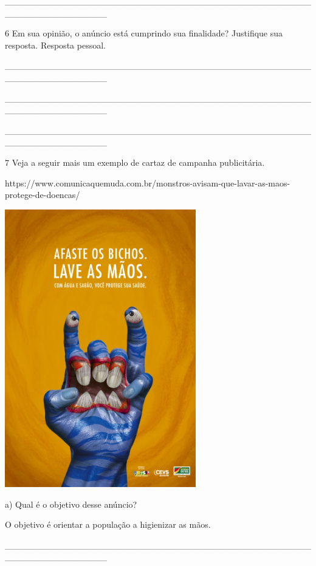 \begin{boxlist}
{\_\_\_\_\_\_\_\_\_\_\_\_\_\_\_\_\_\_\_\_\_\_\_\_\_\_\_\_\_\_\_\_\_\_\_\_\_\_\_\_\_\_\_\_\_\_\_\_\_\_\_\_\_\_\_\_\_\_\_\_\_\_\_\_

\num{6} Em sua opinião, o anúncio está cumprindo sua finalidade? Justifique
sua resposta. Resposta pessoal.

\_\_\_\_\_\_\_\_\_\_\_\_\_\_\_\_\_\_\_\_\_\_\_\_\_\_\_\_\_\_\_\_\_\_\_\_\_\_\_\_\_\_\_\_\_\_\_\_\_\_\_\_\_\_\_\_\_\_\_\_\_\_\_\_

\_\_\_\_\_\_\_\_\_\_\_\_\_\_\_\_\_\_\_\_\_\_\_\_\_\_\_\_\_\_\_\_\_\_\_\_\_\_\_\_\_\_\_\_\_\_\_\_\_\_\_\_\_\_\_\_\_\_\_\_\_\_\_\_

\_\_\_\_\_\_\_\_\_\_\_\_\_\_\_\_\_\_\_\_\_\_\_\_\_\_\_\_\_\_\_\_\_\_\_\_\_\_\_\_\_\_\_\_\_\_\_\_\_\_\_\_\_\_\_\_\_\_\_\_\_\_\_\_

\num{7} Veja a seguir mais um exemplo de cartaz de campanha publicitária.

https://www.comunicaquemuda.com.br/monstros-avisam-que-lavar-as-maos-protege-de-doencas/

\includegraphics[width=3.27083in,height=4.76432in]{media/image10.jpeg}

a) Qual é o objetivo desse anúncio?

O objetivo é orientar a população a
higienizar as mãos.

\protect\hypertarget{_Hlk127604103}{}{}\_\_\_\_\_\_\_\_\_\_\_\_\_\_\_\_\_\_\_\_\_\_\_\_\_\_\_\_\_\_\_\_\_\_\_\_\_\_\_\_\_\_\_\_\_\_\_\_\_\_\_\_\_\_\_\_\_\_\_\_\_\_\_\_

}
\end{boxlist}
